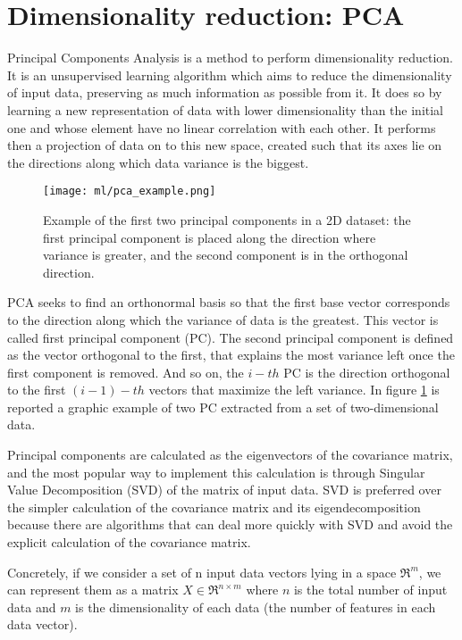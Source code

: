 \documentclass[11pt]{report}
\begin{document}
\section{Dimensionality reduction: PCA}\label{sec:pca_theory}



Principal Components Analysis is a method to perform dimensionality reduction.
It is an unsupervised learning algorithm which aims to reduce the dimensionality of input data, preserving as much information as possible from it.
It does so by learning a new representation of data with lower dimensionality than the initial one and whose element have no linear correlation with each other.
It performs then a projection of data on to this new space, created such that its axes lie on the directions along which data variance is the biggest.

\begin{figure}[h]
\centering
\texttt{[image: ml/pca\_example.png]}
\caption{Example of the first two principal components in a 2D dataset: the first principal component is placed along the direction where variance is greater,  and the second component is in the orthogonal direction.}
\label{fig:pca_example}
\end{figure}

PCA seeks to find an orthonormal basis so that the first base vector corresponds to the direction along which the variance of data is the greatest.
This vector is called first principal component (PC).
The second principal component is defined as the vector orthogonal to the first, that explains the most variance left once the first component is removed.
And so on, the $i-th$ PC is the direction orthogonal to the first $(i-1)-th$ vectors that maximize the left variance.
In figure \ref{fig:pca_example} is reported a graphic example of two PC extracted from a set of two-dimensional data.

Principal components are calculated as the eigenvectors of the covariance matrix, and the most popular way to implement this calculation is through Singular Value Decomposition (SVD) of the matrix of input data.
SVD is preferred over the simpler calculation of the covariance matrix and its eigendecomposition because there are algorithms that can deal more quickly with SVD and avoid the explicit calculation of the covariance matrix.

Concretely, if we consider a set of n input data vectors lying in a space $\Re^m$, we can represent them as a matrix $X \in \Re^{n \times m}$ where $n$ is the total number of input data and $m$ is the dimensionality of each data (the number of features in each data vector).
\end{document}

